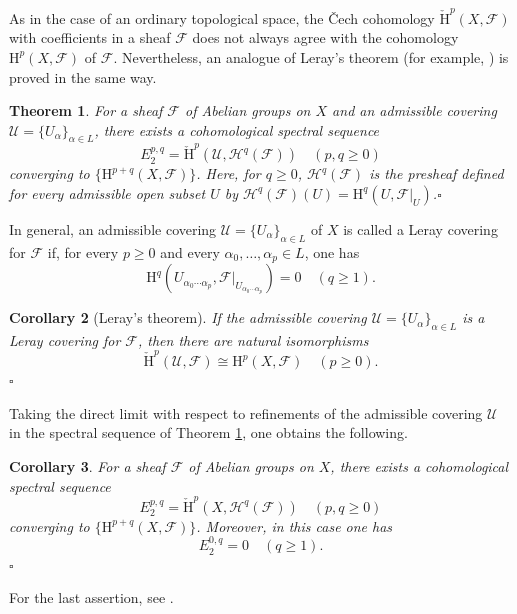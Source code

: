 \documentclass[a4paper,12pt, dvipdfmx]{jsbook}
\def\H{\mathrm{H}}
\def\vH{\mathrm{\check{H}}}
\theoremstyle{plain}
\newtheorem{thm}{\bfseries Theorem}[section]
\newtheorem{cor}[thm]{\bfseries Corollary}
\theoremstyle{definition}
\begin{document}
As in the case of an ordinary topological space, the \v{C}ech cohomology $\vH^p(X,\mathscr{F})$ with coefficients in a sheaf $\mathscr{F}$ does not always agree with the cohomology $\H^p(X,\mathscr{F})$ of $\mathscr{F}$.
Nevertheless, an analogue of Leray's theorem (for example, \cite[Th\'eor\`eme 3.8.1, Cor.\ 1]{Groth1}) is proved in the same way.
\begin{thm}\label{thm-Leraytheorem}{\rm 
For a sheaf $\mathscr{F}$ of Abelian groups on $X$ and an admissible covering $\mathcal{U}=\{U_{\alpha}\}_{\alpha\in L}$, there exists a cohomological spectral sequence
$$
E^{p,q}_2=\vH^p(\mathcal{U},\mathcal{H}^q(\mathscr{F}))\quad(p,q\geq 0)
$$
converging to $\{\H^{p+q}(X,\mathscr{F})\}$.
Here, for $q\geq 0$, $\mathcal{H}^q(\mathscr{F})$ is the presheaf defined for every admissible open subset $U$ by $\mathcal{H}^q(\mathscr{F})(U)=\H^q(U,\mathscr{F}|_U)$.}\hfill$\square$
\end{thm}

In general, an admissible covering $\mathcal{U}=\{U_{\alpha}\}_{\alpha\in L}$ of $X$ is called a Leray covering for $\mathscr{F}$ if, for every $p\geq 0$ and every $\alpha_0,\ldots,\alpha_p\in L$, one has
$$
\H^q(U_{\alpha_0\cdots\alpha_p},\mathscr{F}|_{U_{\alpha_0\cdots\alpha_p}})=0\quad (q\geq 1).
$$
\begin{cor}[{\rm Leray's theorem}]\label{cor-Leraytheorem}{\rm 
If the admissible covering $\mathcal{U}=\{U_{\alpha}\}_{\alpha\in L}$ is a Leray covering for $\mathscr{F}$, then there are natural isomorphisms
$$
\vH^p(\mathcal{U},\mathscr{F})\cong\H^p(X,\mathscr{F})\quad (p\geq 0).
$$}\hfill$\square$
\end{cor}

Taking the direct limit with respect to refinements of the admissible covering $\mathcal{U}$ in the spectral sequence of Theorem \ref{thm-Leraytheorem}, one obtains the following.
\begin{cor}\label{cor-Leraytheorem2}{\rm 
For a sheaf $\mathscr{F}$ of Abelian groups on $X$, there exists a cohomological spectral sequence
$$
E^{p,q}_2=\vH^p(X,\mathcal{H}^q(\mathscr{F}))\quad(p,q\geq 0)
$$
converging to $\{\H^{p+q}(X,\mathscr{F})\}$.
Moreover, in this case one has
$$
E^{0,q}_2=0\quad (q\geq 1).
$$}\hfill$\square$
\end{cor}

For the last assertion, see \cite[Lem.\ 3.8.2]{Groth1}.
\end{document}
